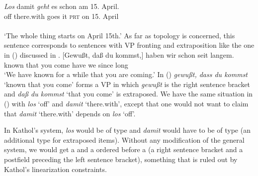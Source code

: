 \documentclass[output=paper,biblatex,babelshorthands,newtxmath,draftmode,colorlinks,citecolor=brown]{langscibook}
\begin{document}
\ea
\label{ex-los-damit-zwei} 
\glll \emph{Los} damit \emph{geht} es schon am 15. April.\footnotemark\\
      off there.with goes it \textsc{prt} on 15. April\\
             {}  {}\\\german
{}
\glt `The whole thing starts on April 15th.'
\z
As far as topology is concerned, this sentence corresponds to sentences with VP fronting and
extraposition like the one in () discussed in .
\ea
\gll {}[Gewußt, daß du kommst,] haben wir schon seit langem.\\
       \spacebr{}known that you come have we \particle{} since long\\\german
\glt `We have known for a while that you are coming.'
\z
In () \emph{gewußt, dass du kommst} `known that you come' forms a VP in which \emph{gewußt}
is the right sentence bracket and \emph{daß du kommst} `that you come' is extraposed. We have the
same situation in () with \emph{los} `off' and \emph{damit} `there.with', except that one
would not want to claim that \emph{damit} `there.with' depends on \emph{los} `off'.

In Kathol's system, \emph{los} would be of type  and \emph{damit} would have to be of type
 (an additional type for extraposed items). Without any modification of the general system,
we would get a  and a  ordered before a  (a right sentence bracket and a
postfield preceding the left sentence bracket), something that is ruled out by Kathol's linearization constraints. 
\end{document}
